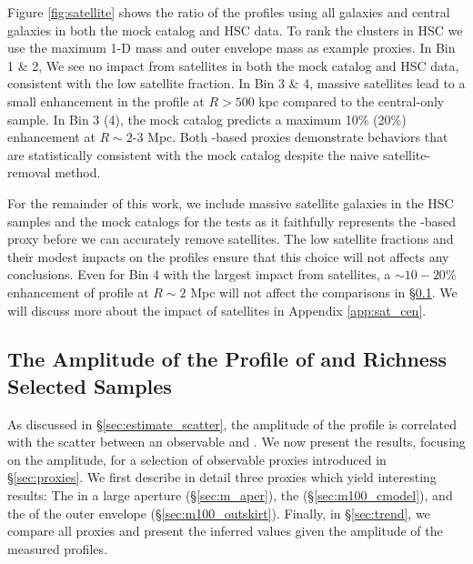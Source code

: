 \documentclass[fleqn,usenatbib,useAMS,english]{mnras}
\begin{document}
    Figure \ref{fig:satellite} shows the ratio of the \dsigma{} profiles using all galaxies
    and central galaxies in both the mock catalog and HSC data.
    To rank the clusters in HSC we use the maximum 1-D mass \mmax{} and outer envelope mass
     as example proxies.
    In Bin 1 \& 2, We see no impact from satellites in both the mock catalog and HSC data,
    consistent with the low satellite fraction.
    In Bin 3 \& 4, massive satellites lead to a small enhancement in the \dsigma{} profile
    at $R > 500$ kpc compared to the central-only sample.
    In Bin 3 (4), the mock catalog predicts a maximum 10\% (20\%) enhancement at $R \sim 2$-3 Mpc.
    Both \mstar{}-based proxies demonstrate behaviors that are statistically consistent with
    the mock catalog despite the naive satellite-removal method.

    For the remainder of this work, we include massive satellite galaxies in the HSC samples
    and the mock catalogs for the \topn{} tests as it faithfully represents the \mstar{}-based 
    \mvir{} proxy before we can accurately remove satellites.
    The low satellite fractions and their modest impacts on the \dsigma{} profiles ensure that
    this choice will not affects any conclusions. 
    Even for Bin 4 with the largest impact from satellites, a $\sim 10-20$\% enhancement of 
    \dsigma{} profile at $R \sim 2$ Mpc will not affect the comparisons in \S \ref{sec:topn_results}.
    We will discuss more about the impact of satellites in Appendix \ref{app:sat_cen}.

\subsection{The Amplitude of the \dsigma{} Profile of \mstar{} and Richness Selected Samples}
    \label{sec:topn_results}

    As discussed in \S \ref{sec:estimate_scatter}, the amplitude of the \dsigma{} profile
    is correlated with the scatter between an observable and \mvir{}.
    We now present the \topn{} results, focusing on the amplitude, for a selection of
    observable proxies introduced in \S \ref{sec:proxies}.
    We first describe in detail three proxies which yield interesting results:
    The \mstar in a large aperture (\S \ref{sec:m_aper}), the \mcmodel{} (\S \ref{sec:m100_cmodel}), and the \mstar{} of the outer envelope
    (\S \ref{sec:m100_outskirt}).
    Finally, in \S \ref{sec:trend}, we compare all \mvir{} proxies and present the inferred
    \sigmh{} values given the amplitude of the measured \dsigma{} profiles.
\end{document}
